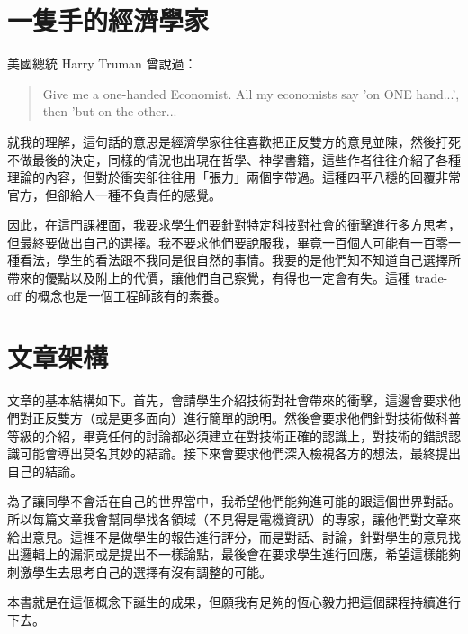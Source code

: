 \section{一隻手的經濟學家}

美國總統 Harry Truman 曾說過：

\begin{quote}
Give me a one-handed Economist. All my economists say 'on ONE hand...', then 'but on the other...
\end{quote}

就我的理解，這句話的意思是經濟學家往往喜歡把正反雙方的意見並陳，然後打死不做最後的決定，同樣的情況也出現在哲學、神學書籍，這些作者往往介紹了各種理論的內容，但對於衝突卻往往用「張力」兩個字帶過。這種四平八穩的回覆非常官方，但卻給人一種不負責任的感覺。

因此，在這門課裡面，我要求學生們要針對特定科技對社會的衝擊進行多方思考，但最終要做出自己的選擇。我不要求他們要說服我，畢竟一百個人可能有一百零一種看法，學生的看法跟不我同是很自然的事情。我要的是他們知不知道自己選擇所帶來的優點以及附上的代價，讓他們自己察覺，有得也一定會有失。這種 trade-off 的概念也是一個工程師該有的素養。

\section{文章架構}

文章的基本結構如下。首先，會請學生介紹技術對社會帶來的衝擊，這邊會要求他們對正反雙方（或是更多面向）進行簡單的說明。然後會要求他們針對技術做科普等級的介紹，畢竟任何的討論都必須建立在對技術正確的認識上，對技術的錯誤認識可能會導出莫名其妙的結論。接下來會要求他們深入檢視各方的想法，最終提出自己的結論。

為了讓同學不會活在自己的世界當中，我希望他們能夠進可能的跟這個世界對話。所以每篇文章我會幫同學找各領域（不見得是電機資訊）的專家，讓他們對文章來給出意見。這裡不是做學生的報告進行評分，而是對話、討論，針對學生的意見找出邏輯上的漏洞或是提出不一樣論點，最後會在要求學生進行回應，希望這樣能夠刺激學生去思考自己的選擇有沒有調整的可能。

本書就是在這個概念下誕生的成果，但願我有足夠的恆心毅力把這個課程持續進行下去。


